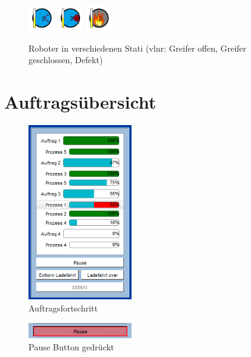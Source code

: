 \begin{figure}[htb]
    \centering
    \includegraphics[width=0.1\textwidth]{Abbildungen/RobotinoGoffen.png}
    \includegraphics[width=0.1\textwidth]{Abbildungen/RobotinoGZu.png}
    \includegraphics[width=0.1\textwidth]{Abbildungen/RobotinoDefect.png}
    \caption{Roboter in verschiedenen Stati (vlnr: Greifer offen, Greifer geschlossen, Defekt)}		
    \label{fig:Robotino}
\end{figure}

\section{Auftragsübersicht}

\begin{figure}[htb]
    \centering
    \includegraphics[width=0.4\textwidth]{Abbildungen/Auftragsfortschritt.png}
    \caption{Auftragsfortschritt}		
    \label{fig:Auftragsfortschritt}
\end{figure}

\begin{figure}[htb]
    \centering
    \includegraphics[width=0.4\textwidth]{Abbildungen/Pause.png}
    \caption{Pause Button gedrückt}		
    \label{fig:Pause}
\end{figure}

